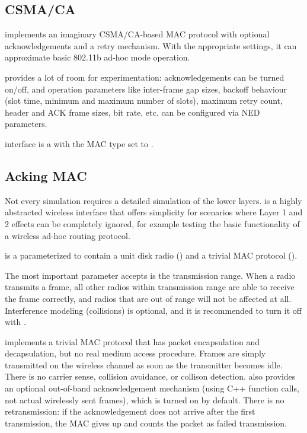 \subsection{CSMA/CA}
\label{sec:interfaces:csma/ca}

 implements an imaginary CSMA/CA-based MAC protocol with
optional acknowledgements and a retry mechanism. With the appropriate settings,
it can approximate basic 802.11b ad-hoc mode operation.

 provides a lot of room for experimentation:
acknowledgements can be turned on/off, and operation parameters like
inter-frame gap sizes, backoff behaviour (slot time, minimum and maximum
number of slots), maximum retry count, header and ACK frame sizes, bit rate,
etc. can be configured via NED parameters.

 interface is a  with
the MAC type set to .

\subsection{Acking MAC}
\label{sec:interfaces:acking-mac}

Not every simulation requires a detailed simulation of the lower layers.
 is a highly abstracted wireless interface
that offers simplicity for scenarios where Layer 1 and 2 effects can be
completely ignored, for example testing the basic functionality of a
wireless ad-hoc routing protocol.

 is a 
parameterized to contain a unit disk radio ()
and a trivial MAC protocol ().

The most important parameter  accepts is the
transmission range. When a radio transmits a frame, all other radios
within transmission range are able to receive the frame correctly,
and radios that are out of range will not be affected at all.
Interference modeling (collisions) is optional, and it is recommended
to turn it off with .

 implements a trivial MAC protocol that has packet
encapsulation and decapsulation, but no real medium access procedure.
Frames are simply transmitted on the wireless channel as soon as the
transmitter becomes idle. There is no carrier sense, collision avoidance,
or collison detection.  also provides an optional
out-of-band acknowledgement mechanism (using C++ function calls,
not actual wirelessly sent frames), which is turned on by default.
There is no retransmission: if the acknowledgement does not arrive
after the first transmission, the MAC gives up and counts the packet
as failed transmission.

